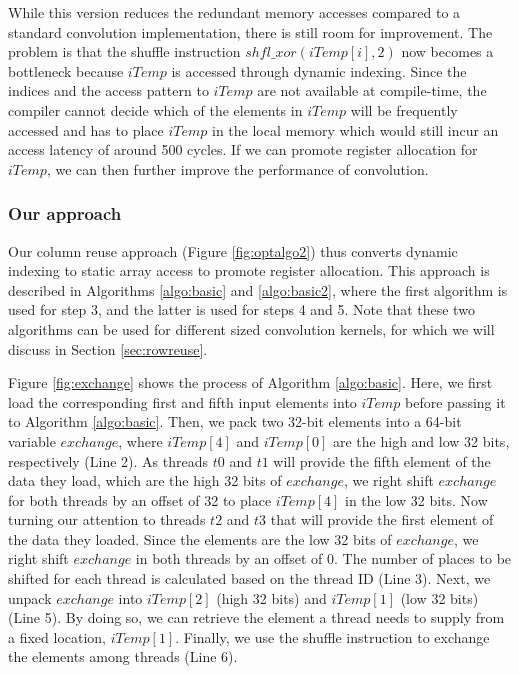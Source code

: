 While this version reduces the redundant memory accesses compared to a standard convolution implementation, there is still room for improvement.
The problem is that the shuffle instruction $shfl\_xor(iTemp[i],2)$ now becomes a bottleneck because $iTemp$ is accessed through dynamic indexing.
Since the indices and the access pattern to $iTemp$ are not available at compile-time, the compiler cannot decide which of the elements in $iTemp$ will be frequently accessed and has to place $iTemp$ in the local memory which would still incur an access latency of around 500 cycles.
If we can promote register allocation for $iTemp$, we can then further improve the performance of convolution.

\subsubsection{Our approach}
Our column reuse approach (Figure \ref {fig:optalgo2}) thus converts dynamic indexing to static array access to promote register
allocation. This approach is described in Algorithms \ref{algo:basic} and \ref{algo:basic2}, where the first algorithm is used for step 3,
and the latter is used for steps 4 and 5. Note that these two algorithms can be used for different sized convolution kernels, for which we
will discuss in Section \ref {sec:rowreuse}.

Figure \ref{fig:exchange} shows the process of Algorithm \ref{algo:basic}. Here, we first load the corresponding first and fifth input
elements into $iTemp$ before passing it to Algorithm \ref{algo:basic}. Then, we pack two 32-bit elements into a 64-bit variable $exchange$,
where $iTemp[4]$ and $iTemp[0]$ are the high and low 32 bits, respectively (Line 2). As threads $t0$ and $t1$ will provide the fifth
element of the data they load, which are the high 32 bits of $exchange$, we right shift $exchange$ for both threads by an offset of 32 to
place $iTemp[4]$ in the low 32 bits. Now turning our attention to threads $t2$ and $t3$ that will provide the first element of the data
they loaded. Since the elements are the low 32 bits of $exchange$, we right shift $exchange$ in both threads by an offset of 0. The number
of places to be shifted for each thread is calculated based on the thread ID (Line 3). Next, we unpack $exchange$ into $iTemp[2]$ (high 32
bits) and $iTemp[1]$ (low 32 bits) (Line 5). By doing so, we can retrieve the element a thread needs to supply from a fixed location,
$iTemp[1]$. Finally, we use the shuffle instruction to exchange the elements among threads (Line 6).

